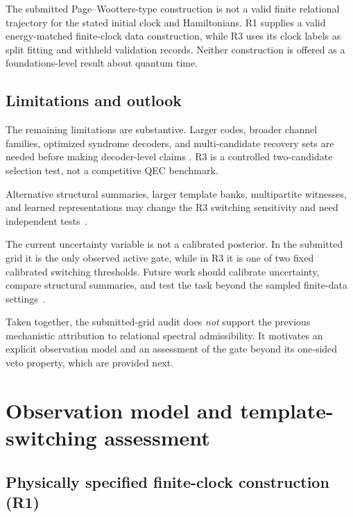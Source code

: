 \documentclass{iopjournal}
\begin{document}
The submitted Page--Wootters-type construction is not a valid finite relational
trajectory for the stated initial clock and Hamiltonians.  R1 supplies a valid
energy-matched finite-clock data construction, while R3 uses its clock labels as
split fitting and withheld validation records.  Neither construction is offered
as a foundations-level result about quantum time.

\subsection{Limitations and outlook}
\label{subsec:discussion-limitations}

The remaining limitations are substantive.  Larger codes, broader channel
families, optimized syndrome decoders, and multi-candidate recovery sets are
needed before making decoder-level claims
\cite{Asaka2026QuantumSpatialQEC,Filippov2024ScalabilityErrorMitigation,Li2025ZMixedAmplitudeDamping}.
R3 is a controlled two-candidate selection test, not a competitive QEC benchmark.

Alternative structural summaries, larger template banks, multipartite witnesses,
and learned representations may change the R3 switching sensitivity and need
independent tests~\cite{Brito2020MultipartiteInterference,Huang2026QuantumSpectralPDEs,Alexeev2025AIQuantumComputing}.

The current uncertainty variable is not a calibrated posterior.  In the submitted
grid it is the only observed active gate, while in R3 it is one of two fixed
calibrated switching thresholds.  Future work should calibrate uncertainty,
compare structural summaries, and test the task beyond the sampled finite-data
settings~\cite{Mohseni2021AdiabaticErrorSuppression,Lewis2026PulseQualityOptimisation}.

Taken together, the submitted-grid audit does \emph{not} support the previous
mechanistic attribution to relational spectral admissibility.  It motivates
an explicit observation model and an assessment of the gate beyond its
one-sided veto property, which are provided next.

\section{Observation model and template-switching assessment}\label{sec:revision-results}

\subsection{Physically specified finite-clock construction (R1)}
\label{subsec:clock-role}
\end{document}
